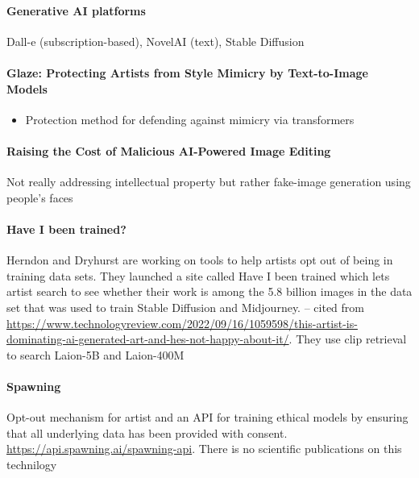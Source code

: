 \paragraph{Generative AI platforms}
Dall-e (subscription-based), NovelAI (text), Stable Diffusion

\paragraph{Glaze: Protecting Artists from Style Mimicry by Text-to-Image Models}
\begin{itemize}
    \item Protection method for defending against mimicry via transformers
\end{itemize}

\paragraph{Raising the Cost of Malicious AI-Powered Image Editing}
Not really addressing intellectual property but rather fake-image generation using people's faces

\paragraph{Have I been trained?}
Herndon and Dryhurst are working on tools to help artists opt out of being in training data sets. They launched a site called Have I been trained which lets artist search to see whether their work is among the 5.8 billion images in the data set that was used to train Stable Diffusion and Midjourney. -- cited from \url{https://www.technologyreview.com/2022/09/16/1059598/this-artist-is-dominating-ai-generated-art-and-hes-not-happy-about-it/}. They use clip retrieval to search Laion-5B and Laion-400M

\paragraph{Spawning} Opt-out mechanism for artist and an API for training ethical models by ensuring that all underlying data has been provided with consent. \url{https://api.spawning.ai/spawning-api}. There is no scientific publications on this technilogy

